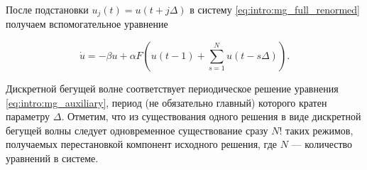 После подстановки $u_j(t) = u(t + j\Delta)$ в систему \eqref{eq:intro:mg_full_renormed} получаем вспомогательное уравнение

\begin{equation}
	\label{eq:intro:mg_auxiliary}
	\dot{u}=-\beta u + \alpha F\left(u(t - 1) + \sum_{s=1}^{N}u(t-s\Delta)\right).
\end{equation}

Дискретной бегущей волне соответствует периодическое решение уравнения \eqref{eq:intro:mg_auxiliary}, период (не обязательно главный) которого кратен параметру $\Delta$. Отметим, что из существования одного решения в виде дискретной бегущей волны следует одновременное существование сразу $N!$ таких режимов, получаемых перестановкой компонент исходного решения, где $N$ --- количество уравнений в системе.


%
%
%
%

